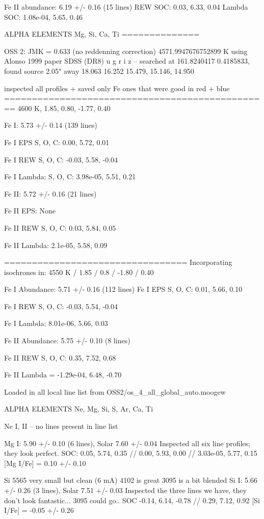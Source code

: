 \documentclass{emulateapj}
\begin{document}
Fe II abundance: 6.19 +/- 0.16 (15 lines)
REW SOC: 0.03, 6.33, 0.04
Lambda SOC: 1.08e-04, 5.65, 0.46





ALPHA ELEMENTS Mg, Si, Ca, Ti
==============






OSS 2: JMK = 0.633 (no reddenning correction)
4571.9947676752899 K using Alonso 1999 paper
SDSS (DR8) u g r i z -- searched at 161.8240417 0.4185833, found source 2.05" away
18.063 16.252 15.479, 15.146, 14.950

inspected all profiles + saved only Fe ones that were good in red + blue
================================================
4600 K, 1.85, 0.80, -1.77, 0.40

Fe I: 5.73 +/- 0.14 (139 lines)

Fe I EPS
S, O, C: 0.00, 5.72, 0.01

Fe I REW
S, O, C: -0.03, 5.58, -0.04

Fe I Lambda:
S, O, C: 3.98e-05, 5.51, 0.21

Fe II: 5.72 +/- 0.16 (21 lines)

Fe II EPS: None

Fe II REW S, O, C: 0.03, 5.84, 0.05

Fe II Lambda: 2.1e-05, 5.58, 0.09

=================================
Incorporating isochrones in:
4550 K / 1.85 / 0.8 / -1.80 / 0.40

Fe I Abundance: 5.71 +/- 0.16 (112 lines)
Fe I EPS S, O, C: 0.01, 5.66, 0.10

Fe I REW S, O, C: -0.03, 5.54, -0.04

Fe I Lambda: 8.01e-06, 5.66, 0.03

Fe II Abundance: 5.75 +/- 0.10 (8 lines)

Fe II REW S, O, C: 0.35, 7.52, 0.68

Fe II Lambda = -1.29e-04, 6.48, -0.70

Loaded in all local line list from OSS2/os_4_all_global_auto.moogew

ALPHA ELEMENTS
Ne, Mg, Si, S, Ar, Ca, Ti


Ne I, II -- no lines present in line list

Mg I: 5.90 +/- 0.10 (6 lines), Solar 7.60 +/- 0.04
Inspected all six line profiles; they look perfect.
SOC: 0.05, 5.74, 0.35 // 0.00, 5.93, 0.00 // 3.03e-05, 5.77, 0.15
[Mg I/Fe] = 0.10 +/- 0.10

Si
5565 very small but clean (6 mA)
4102 is great
3095 is a bit blended
Si I: 5.66 +/- 0.26 (3 lines), Solar 7.51 +/- 0.03
Inspected the three lines we have, they don't look fantastic...  3095 could go..
SOC -0.14, 6.14, -0.78 // 0.29, 7.12, 0.92
[Si I/Fe] = -0.05 +/- 0.26
\end{document}
